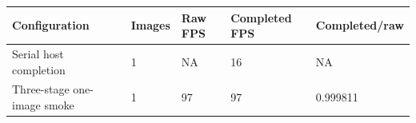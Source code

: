 \begin{tabular}{lllll}
\hline
Configuration & Images & Raw FPS & Completed FPS & Completed/raw \\
\hline
Serial host completion & 1 & NA & 16 & NA \\
Three-stage one-image smoke & 1 & 97 & 97 & 0.999811 \\
\hline
\end{tabular}
